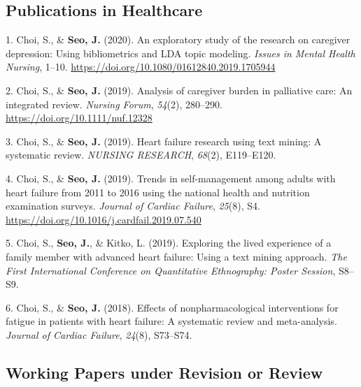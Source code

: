 \documentclass[11pt,a4paper,]{awesome-cv}
\newlength{\cslhangindent}
\newenvironment{CSLReferences}[2] %
 {\begin{list}{}{%
  \setlength{\itemindent}{0pt}
  \setlength{\leftmargin}{0pt}
  \setlength{\parsep}{0pt}
  \ifodd #1
   \setlength{\leftmargin}{\cslhangindent}
   \setlength{\itemindent}{-1\cslhangindent}
  \fi
  \setlength{\itemsep}{#2\baselineskip}}}
 {\end{list}}
\begin{document}
\subsection{Publications in
Healthcare}\label{publications-in-healthcare}

\label{refs-d735fc8e424a60effc95b6b86f680502}
\begin{CSLReferences}{1}{0}
1. Choi, S., \& \textbf{Seo, J.} (2020). An exploratory study of the
research on caregiver depression: Using bibliometrics and LDA topic
modeling. \emph{Issues in Mental Health Nursing}, 1--10.
\url{https://doi.org/10.1080/01612840.2019.1705944}

2. Choi, S., \& \textbf{Seo, J.} (2019). Analysis of caregiver burden in
palliative care: An integrated review. \emph{Nursing Forum},
\emph{54}(2), 280--290. \url{https://doi.org/10.1111/nuf.12328}

3. Choi, S., \& \textbf{Seo, J.} (2019). Heart failure research using
text mining: A systematic review. \emph{NURSING RESEARCH}, \emph{68}(2),
E119--E120.

4. Choi, S., \& \textbf{Seo, J.} (2019). Trends in self-management among
adults with heart failure from 2011 to 2016 using the national health
and nutrition examination surveys. \emph{Journal of Cardiac Failure},
\emph{25}(8), S4. \url{https://doi.org/10.1016/j.cardfail.2019.07.540}

5. Choi, S., \textbf{Seo, J.}, \& Kitko, L. (2019). Exploring the lived
experience of a family member with advanced heart failure: Using a text
mining approach. \emph{The First International Conference on
Quantitative Ethnography: Poster Session}, S8--S9.

6. Choi, S., \& \textbf{Seo, J.} (2018). Effects of nonpharmacological
interventions for fatigue in patients with heart failure: A systematic
review and meta-analysis. \emph{Journal of Cardiac Failure},
\emph{24}(8), S73--S74.

\end{CSLReferences}

\subsection{Working Papers under Revision or
Review}\label{working-papers-under-revision-or-review}
\end{document}

